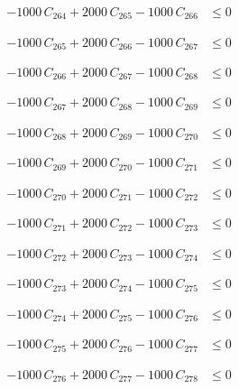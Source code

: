 \documentclass[a4paper,11pt]{article}
\begin{document}
\begin{align}
-1000\,C_{264} + 2000\,C_{265} - 1000\,C_{266} &\leq 0 \nonumber
\end{align}

\begin{align}
-1000\,C_{265} + 2000\,C_{266} - 1000\,C_{267} &\leq 0 \nonumber
\end{align}

\begin{align}
-1000\,C_{266} + 2000\,C_{267} - 1000\,C_{268} &\leq 0 \nonumber
\end{align}

\begin{align}
-1000\,C_{267} + 2000\,C_{268} - 1000\,C_{269} &\leq 0 \nonumber
\end{align}

\begin{align}
-1000\,C_{268} + 2000\,C_{269} - 1000\,C_{270} &\leq 0 \nonumber
\end{align}

\begin{align}
-1000\,C_{269} + 2000\,C_{270} - 1000\,C_{271} &\leq 0 \nonumber
\end{align}

\begin{align}
-1000\,C_{270} + 2000\,C_{271} - 1000\,C_{272} &\leq 0 \nonumber
\end{align}

\begin{align}
-1000\,C_{271} + 2000\,C_{272} - 1000\,C_{273} &\leq 0 \nonumber
\end{align}

\begin{align}
-1000\,C_{272} + 2000\,C_{273} - 1000\,C_{274} &\leq 0 \nonumber
\end{align}

\begin{align}
-1000\,C_{273} + 2000\,C_{274} - 1000\,C_{275} &\leq 0 \nonumber
\end{align}

\begin{align}
-1000\,C_{274} + 2000\,C_{275} - 1000\,C_{276} &\leq 0 \nonumber
\end{align}

\begin{align}
-1000\,C_{275} + 2000\,C_{276} - 1000\,C_{277} &\leq 0 \nonumber
\end{align}

\begin{align}
-1000\,C_{276} + 2000\,C_{277} - 1000\,C_{278} &\leq 0 \nonumber
\end{align}
\end{document}
